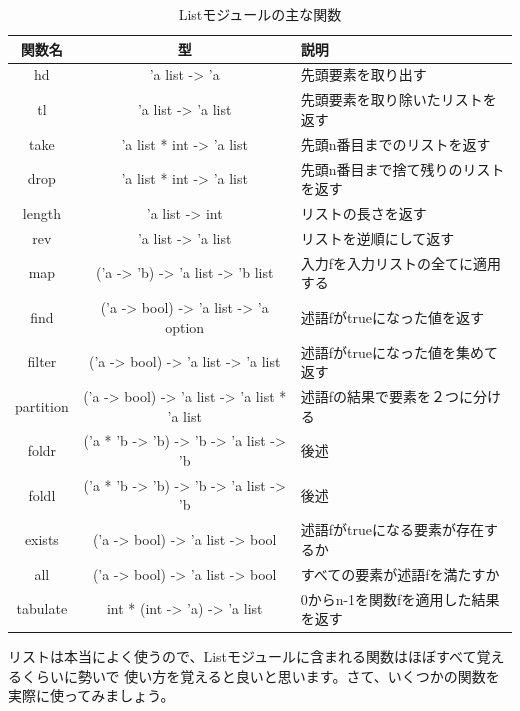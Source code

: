 \documentclass[11pt,a4paper]{jarticle}
\begin{document}
\begin{table}[htbp]
  \begin{tabular}{|c|c|l|}
\hline
関数名 & 型 & 説明 \\ \hline \hline
hd & 'a list -> 'a                                         & 先頭要素を取り出す\\ \hline
tl & 'a list -> 'a list                                    & 先頭要素を取り除いたリストを返す\\ \hline
take & 'a list * int -> 'a list                            & 先頭n番目までのリストを返す\\ \hline
drop & 'a list * int -> 'a list                            & 先頭n番目まで捨て残りのリストを返す\\ \hline
length & 'a list -> int                                    & リストの長さを返す\\ \hline
rev & 'a list -> 'a list                                   & リストを逆順にして返す\\ \hline
map & ('a -> 'b) -> 'a list -> 'b list                     & 入力fを入力リストの全てに適用する\\ \hline
find & ('a -> bool) -> 'a list -> 'a option                & 述語fがtrueになった値を返す\\ \hline
filter & ('a -> bool) -> 'a list -> 'a list                & 述語fがtrueになった値を集めて返す\\ \hline
partition & ('a -> bool) -> 'a list -> 'a list * 'a list   & 述語fの結果で要素を２つに分ける\\ \hline
foldr & ('a * 'b -> 'b) -> 'b -> 'a list -> 'b             & 後述\\ \hline
foldl & ('a * 'b -> 'b) -> 'b -> 'a list -> 'b             & 後述\\ \hline
exists & ('a -> bool) -> 'a list -> bool                   & 述語fがtrueになる要素が存在するか\\ \hline
all & ('a -> bool) -> 'a list -> bool                      & すべての要素が述語fを満たすか\\ \hline
tabulate & int * (int -> 'a) -> 'a list                    & 0からn-1を関数fを適用した結果を返す\\ \hline
  \end{tabular}
  \caption{Listモジュールの主な関数}
  \label{fig:list-table}
\end{table}

リストは本当によく使うので、Listモジュールに含まれる関数はほぼすべて覚えるくらいに勢いで
使い方を覚えると良いと思います。さて、いくつかの関数を実際に使ってみましょう。
\end{document}

